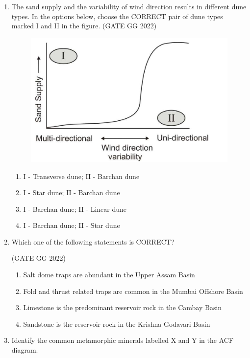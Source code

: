 \documentclass[journal]{IEEEtran}
\begin{document}
\begin{enumerate}[start=1]
\item The sand supply and the variability of wind direction results in different dune types. In the options below, choose the CORRECT pair of dune types marked I and II in the figure.
\hfill(GATE GG 2022)
\begin{figure}[H]
\centering
\includegraphics[width = 0.47\columnwidth]{figs/09.png}
\caption*{}
\label{fig:q5}
\end{figure}
\begin{enumerate}
\item I - Transverse dune; II - Barchan dune  
\item I - Star dune; II - Barchan dune  
\item I - Barchan dune; II - Linear dune  
\item I - Barchan dune; II - Star dune  
\end{enumerate}

\item Which one of the following statements is CORRECT?  

\hfill(GATE GG 2022)
\begin{enumerate}
\item Salt dome traps are abundant in the Upper Assam Basin  
\item Fold and thrust related traps are common in the Mumbai Offshore Basin  
\item Limestone is the predominant reservoir rock in the Cambay Basin  
\item Sandstone is the reservoir rock in the Krishna-Godavari Basin  
\end{enumerate}


\item Identify the common metamorphic minerals labelled X and Y in the ACF diagram.  


\end{enumerate}
\end{document}
